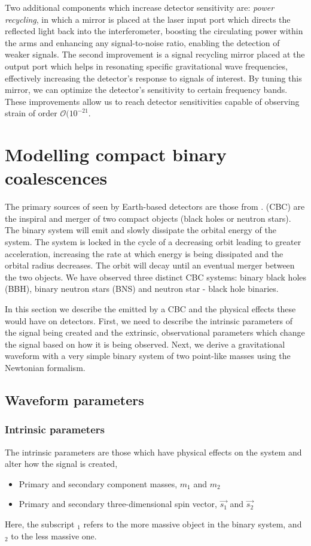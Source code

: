 Two additional components which increase detector sensitivity are: \textit{power recycling}, in which a mirror is placed at the laser input port which directs the reflected light back into the interferometer, boosting the circulating power within the arms and enhancing any signal-to-noise ratio, enabling the detection of weaker \gwadj signals. The second improvement is a signal recycling mirror placed at the output port which helps in resonating specific gravitational wave frequencies, effectively increasing the detector's response to signals of interest. By tuning this mirror, we can optimize the detector's sensitivity to certain frequency bands. These improvements allow us to reach detector sensitivities capable of observing strain of order $\mathcal{O(10^{-21}}$. 

\section{\label{1:sec:modelling_CBC}Modelling compact binary coalescences}

The primary sources of \gws seen by Earth-based \gwadj detectors are those from \cbcs. \Cbcs (CBC) are the inspiral and merger of two compact objects (black holes or neutron stars). The binary system will emit \gws and slowly dissipate the orbital energy of the system. The system is locked in the cycle of a decreasing orbit leading to greater acceleration, increasing the rate at which energy is being dissipated and the orbital radius decreases. The orbit will decay until an eventual merger between the two objects. We have observed three distinct CBC systems: binary black holes (BBH), binary neutron stars (BNS) and neutron star - black hole binaries. 

In this section we describe the \gws emitted by a CBC and the physical effects these would have on \gwadj detectors. First, we need to describe the intrinsic parameters of the \gwadj signal being created and the extrinsic, observational parameters which change the signal based on how it is being observed. Next, we derive a gravitational waveform with a very simple binary system of two point-like masses using the Newtonian formalism.

\subsection{\label{1:sec:CBC-parameters}Waveform parameters}

\subsubsection{Intrinsic parameters}
The intrinsic parameters are those which have physical effects on the system and alter how the \gwadj signal is created,
\begin{itemize}
   \item Primary and secondary component masses, $m_{1}$ and $m_{2}$
   \item Primary and secondary three-dimensional spin vector, $\vec{s_{1}}$ and $\vec{s_{2}}$
\end{itemize}
Here, the subscript $_1$ refers to the more massive object in the binary system, and $_2$ to the less massive one.

